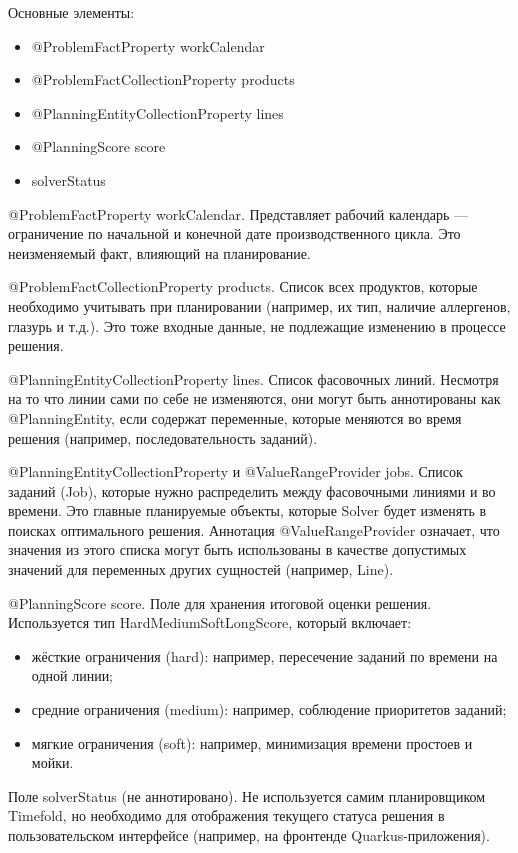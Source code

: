 Основные элементы:

\begin{itemize}
    \item @ProblemFactProperty workCalendar
    \item @ProblemFactCollectionProperty products
    \item @PlanningEntityCollectionProperty lines
    \item @PlanningScore score
    \item solverStatus
\end{itemize}

@ProblemFactProperty workCalendar. Представляет рабочий календарь — ограничение по начальной и конечной дате производственного цикла. Это неизменяемый факт, влияющий на планирование.

@ProblemFactCollectionProperty products. Список всех продуктов, которые необходимо учитывать при планировании (например, их тип, наличие аллергенов, глазурь и т.д.). Это тоже входные данные, не подлежащие изменению в процессе решения.

@PlanningEntityCollectionProperty lines. Список фасовочных линий. Несмотря на то что линии сами по себе не изменяются, они могут быть аннотированы как @PlanningEntity, если содержат переменные, которые меняются во время решения (например, последовательность заданий).

@PlanningEntityCollectionProperty и @ValueRangeProvider jobs. Список заданий (Job), которые нужно распределить между фасовочными линиями и во времени. Это главные планируемые объекты, которые Solver будет изменять в поисках оптимального решения. Аннотация @ValueRangeProvider означает, что значения из этого списка могут быть использованы в качестве допустимых значений для переменных других сущностей (например, Line).

@PlanningScore score. Поле для хранения итоговой оценки решения. Используется тип HardMediumSoftLongScore, который включает:
    \begin{itemize}
        \item жёсткие ограничения (hard): например, пересечение заданий по времени на одной линии;
        \item средние ограничения (medium): например, соблюдение приоритетов заданий;
        \item мягкие ограничения (soft): например, минимизация времени простоев и мойки.
    \end{itemize}

Поле solverStatus (не аннотировано). Не используется самим планировщиком Timefold, но необходимо для отображения текущего статуса решения в пользовательском интерфейсе (например, на фронтенде Quarkus-приложения).

